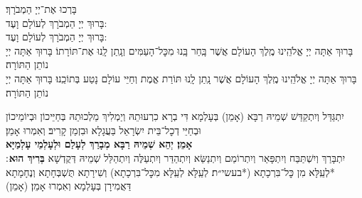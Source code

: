 

\newcommand{\engcite}[2]{(\textit{#1} #2)}

\begin{center}
	\begin{large}
		בָּרְכוּ אֶת־יְיָ הַמְבֹרָךְ׃\\
		
		\vspace{6pt}	
		בָּרוּךְ יְיָ הַמְבֹרָךְ לְעוֹלָם וָעֶד:\\
		
		\vspace{6pt}
		בָּרוּךְ יְיָ הַמְבֹרָךְ לְעוֹלָם וָעֶד:\\
		
		
		
		\vspace{6pt}
		בָּרוּךְ אַתָּה יְיָ אֱלֹהֵֽינוּ מֶֽלֶךְ הָעוֹלָם אֲשֶׁר בָּֽחַר בָּֽנוּ מִכׇּל־הָעַמִּים
		וְנָֽתַן לָֽנוּ אֶת־תּוֹרָתוֹ׃ בָּרוּךְ אַתָּה יְיָ נוֹתֵן הַתּוֹרָה׃\\
		\vspace{8pt}
		בָּרוּךְ אַתָּה יְיָ אֱלֹהֵֽינוּ מֶֽלֶךְ הָעוֹלָם אֲשֶׁר נָֽתַן לָֽנוּ תּוֹרַת אֱמֶת
		וְחַיֵּי עוֹלָם נָטַע בְּתוֹכֵֽנוּ׃ בָּרוּךְ אַתָּה יְיָ נוֹתֵן הַתּוֹרָה׃
	\end{large}
\end{center}


\begin{large}
	יִתְגַּדַּל וְיִתְקַדַּשׁ שְׁמֵיהּ רַבָּא (\kahal אָמֵן)
	בְּעָלְמָא דִּי בְרָא כִרְעוּתֵהּ וְיַמְלִיךְ מַלְכוּתֵהּ בְּחַיֵּיכוֹן וּבְיוֹמֵיכוֹן וּבְחַיֵּי דְכׇל־בֵּית יִשְׂרָאֵל בַּעֲגָלָא וּבִזְמַן קָרִיב׃ וְאִמְרוּ אָמֵן׃\\
	\textbf{\kahal
		אָמֵן׃ יְהֵא שְׁמֵיהּ רַבָּא מְבָרַךְ לְעָלַם וּלְעָלְמֵי עָלְמַיָּא}\\
	יִתְבָּרַךְ וְיִשְׁתַּבַּח וְיִתְפָּאַר וְיִתְרוֹמַם וְיִתְנַשֵּׂא וְיִתְהַדַּר וְיִתְעַלֶּה וְיִתְהַלַּל שְׁמֵיהּ דְּקֻדְשָׁא
	\textbf{בְּרִיךְ הוּא}
	׃ *לְעֵֽלָּא מִן כׇּל־בִּרְכָתָא
	(*\textsf{\footnotesize בעשי״ת׃}
	לְעֵֽלָּא לְעֵֽלָּא מִכׇּל־בִּרְכָתָא) וְשִׁירָתָא תֻּשְׁבְּחָתָא וְנֶחָמָתָא דַּאֲמִירָן בְּעָלְמָא וְאִמְרוּ אָמֵן׃ (\kahal אָמֵן)
\end{large}

